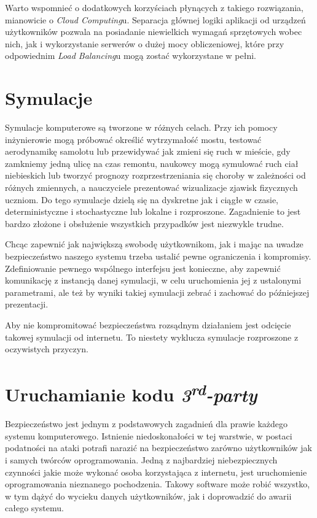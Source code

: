 \par Warto wspomnieć o dodatkowych korzyściach płynących z takiego rozwiązania, mianowicie o \emph{Cloud Computing}u. Separacja głównej logiki aplikacji od urządzeń użytkowników pozwala na posiadanie niewielkich wymagań sprzętowych wobec nich, jak i wykorzystanie serwerów o dużej mocy obliczeniowej, które przy odpowiednim \emph{Load Balancing}u mogą zostać wykorzystane w pełni.

\section{Symulacje}

\par Symulacje komputerowe są tworzone w różnych celach. Przy ich pomocy inżynierowie mogą próbować określić wytrzymałość mostu, testować aerodynamikę samolotu lub przewidywać jak zmieni się ruch w mieście, gdy zamkniemy jedną ulicę na czas remontu, naukowcy mogą symulować ruch ciał niebieskich lub tworzyć prognozy rozprzestrzeniania się choroby w zależności od różnych zmiennych, a nauczyciele prezentować wizualizacje zjawisk fizycznych uczniom. Do tego symulacje dzielą się na dyskretne jak i ciągłe w czasie, deterministyczne i stochastyczne lub lokalne i rozproszone. Zagadnienie to jest bardzo złożone i obsłużenie wszystkich przypadków jest niezwykle trudne.

\par Chcąc zapewnić jak największą swobodę użytkownikom, jak i mając na uwadze bezpieczeństwo naszego systemu trzeba ustalić pewne ograniczenia i kompromisy. Zdefiniowanie pewnego wspólnego interfejsu jest konieczne, aby zapewnić komunikację z instancją danej symulacji, w celu uruchomienia jej z ustalonymi parametrami, ale też by wyniki takiej symulacji zebrać i zachować do późniejszej prezentacji.

\par Aby nie kompromitować bezpieczeństwa rozsądnym działaniem jest odcięcie takowej symulacji od internetu. To niestety wyklucza symulacje rozproszone z oczywistych przyczyn.

\section{Uruchamianie kodu \emph{3\textsuperscript{rd}-party}}

\par Bezpieczeństwo jest jednym z podstawowych zagadnień dla prawie każdego systemu komputerowego. Istnienie niedoskonałości w tej warstwie, w postaci podatności na ataki potrafi narazić na bezpieczeństwo zarówno użytkowników jak i samych twórców oprogramowania. Jedną z najbardziej niebezpiecznych czynności jakie może wykonać osoba korzystająca z internetu, jest uruchomienie oprogramowania nieznanego pochodzenia. Takowy software może robić wszystko, w tym dążyć do wycieku danych użytkowników, jak i doprowadzić do awarii całego systemu.

